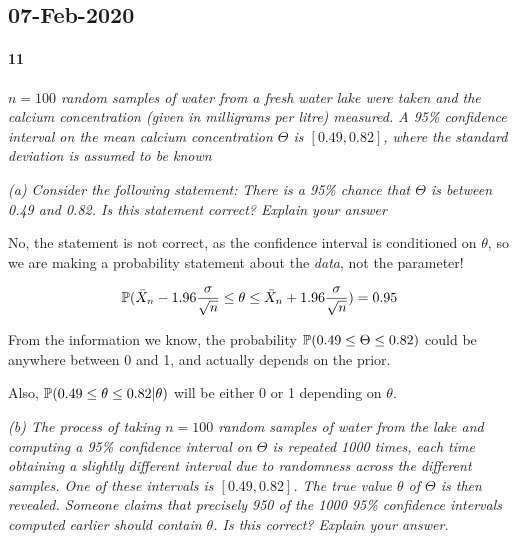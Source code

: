 \documentclass[a4paper]{article}
\begin{document}
        \subsection*{07-Feb-2020}
            \paragraph{11}
            \textit{$n = 100$ random samples of water from a fresh water lake
            were taken and the calcium concentration (given in milligrams per
            litre) measured. A 95\% confidence interval on the mean calcium
            concentration $\Theta$ is $[0.49, 0.82]$, where the standard
            deviation is assumed to be known}

            \textit{(a) Consider the following statement: There is a 95\% chance
            that $\Theta$ is between 0.49 and 0.82. Is this statement correct?
            Explain your answer}

                No, the statement is not correct, as the confidence interval is
                conditioned on $\theta$, so we are making a probability
                statement about the \textit{data}, not the parameter!

                \[
                    \mathbb{P}(\bar X_n - 1.96 \frac{\sigma}{\sqrt{n}} \leq \theta
                    \leq \bar X_n + 1.96 \frac{\sigma}{\sqrt{n}}) = 0.95
                \]

                From the information we know, the probability $\mathbb{P}(0.49 \leq
                \Theta \leq 0.82)$ could be anywhere between 0 and 1, and
                actually depends on the prior.

                Also, $\mathbb{P}(0.49 \leq \theta \leq 0.82 | \theta)$ will be
                either 0 or 1 depending on $\theta$.

            \textit{(b) The process of taking $n = 100$ random samples of water
            from the lake and computing a 95\% confidence interval on $\Theta$
            is repeated 1000 times, each time obtaining a slightly different
            interval due to randomness across the different samples. One of
            these intervals is $[0.49, 0.82]$. The true value $\theta$ of
            $\Theta$ is then revealed. Someone claims that precisely 950 of the
            1000 95\% confidence intervals computed earlier should contain
            $\theta$. Is this correct? Explain your answer.}
\end{document}
